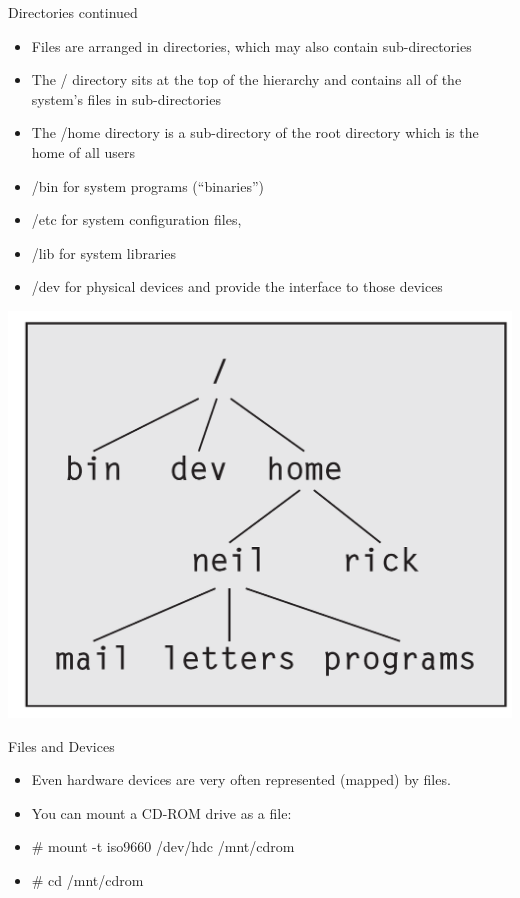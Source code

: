 \documentclass{beamer}
\begin{document}
\begin{frame}{Directories continued}
\begin{itemize}
\item Files are arranged in directories, which may also contain sub-directories
\item The / directory sits at the top of the hierarchy and contains all of the system's files in sub-directories
\item The /home directory is a sub-directory of the root directory which is the home of all users
\item /bin for system programs (``binaries'')
\item /etc for system configuration files,
\item /lib for system libraries
\item /dev for physical devices and provide the interface to those devices
\end{itemize}
\end{frame}

\begin{frame}{}
\includegraphics[width=1.0\textwidth]{../imgs/simple-directories.png}
\end{frame}

\begin{frame}{Files and Devices}
\begin{itemize}
\item Even hardware devices are very often represented (mapped) by files.
\item You can mount a CD-ROM drive as a file:
\item \# mount -t iso9660 /dev/hdc /mnt/cdrom
\item \# cd /mnt/cdrom
\end{itemize}
\end{frame}
\end{document}
